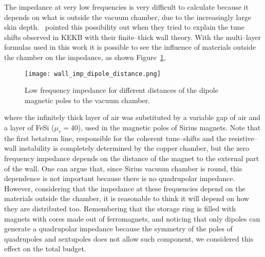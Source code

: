     The impedance at very low frequencies is very difficult to calculate because it depends on what is outside the vacuum chamber, due to the increasingly large skin depth.~ pointed this possibility out when they tried to explain the tune shifts observed in KEKB with their finite--thick wall theory. With the multi--layer formulas used in this work it is possible to see the influence of materials outside the chamber on the impedance, as shown Figure~\ref{fig:wall_imp_dipole_distance},
    \begin{figure}
        \centering
        \texttt{[image: wall\_imp\_dipole\_distance.png]}
        \caption{Low frequency impedance for different distances of the dipole magnetic poles to the vacuum chamber.}
        \label{fig:wall_imp_dipole_distance}
    \end{figure}
    where the infinitely thick layer of air was substituted by a variable gap of air and a layer of FeSi ($\mu_r = 40$), used in the magnetic poles of Sirius magnets. Note that the first betatron line, responsible for the coherent tune--shifts and the resistive--wall instability is completely determined by the copper chamber, but the zero frequency impedance depends on the distance of the magnet to the external part of the wall. One can argue that, since Sirius vacuum chamber is round, this dependence is not important because there is no quadrupolar impedance. However, considering that the impedance at these frequencies depend on the materials outside the chamber, it is reasonable to think it will depend on how they are distributed too. Remembering that the storage ring is filled with magnets with cores made out of ferromagnets, and noticing that only dipoles can generate a quadrupolar impedance because the symmetry of the poles of quadrupoles and sextupoles does not allow such component, we considered this effect on the total budget.

